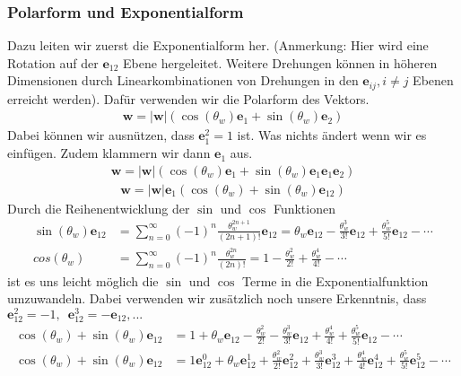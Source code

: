 \subsubsection{Polarform und Exponentialform}
Dazu leiten wir zuerst die Exponentialform her. (Anmerkung: Hier wird eine Rotation auf der $\mathbf{e}_{12}$ Ebene hergeleitet. Weitere Drehungen können in höheren Dimensionen durch Linearkombinationen von Drehungen in den $\mathbf{e}_{ij}, i\not=j$ Ebenen erreicht werden). Dafür verwenden wir die Polarform des Vektors.
\begin{align}
	\mathbf{w} = |\mathbf{w}| \left(\cos(\theta_w) \mathbf{e}_1 + \sin(\theta_w) \mathbf{e}_2\right)
\end{align}
Dabei können wir ausnützen, dass $\mathbf{e}_1^2 = 1$ ist. Was nichts ändert wenn wir es einfügen. Zudem klammern wir dann $\mathbf{e}_1$ aus. 
\begin{align}\label{e1ausklammern}
	\mathbf{w} = |\mathbf{w}| \left(\cos(\theta_w) \mathbf{e}_1 + \sin(\theta_w) \mathbf{e}_1\mathbf{e}_1\mathbf{e}_2\right)
\end{align}
\begin{align}
	\mathbf{w} = |\mathbf{w}|\mathbf{e}_1\left(\cos(\theta_w)+ \sin(\theta_w) \mathbf{e}_{12}\right)
\end{align}
Durch die Reihenentwicklung der $\sin$ und $\cos$ Funktionen
\begin{align}
	\sin(\theta_w)\mathbf{e}_{12}&=\sum _{n=0}^{\infty }(-1)^{n}{\frac {\theta_w^{2n+1}}{(2n+1)!}}\mathbf{e}_{12} =\theta_w\mathbf{e}_{12}-{\frac {\theta_w^{3}}{3!}}\mathbf{e}_{12}+{\frac {\theta_w^{5}}{5!}}\mathbf{e}_{12}-\cdots \\
	cos(\theta_w)&=\sum _{n=0}^{\infty }(-1)^{n}{\frac {\theta_w^{2n}}{(2n)!}} =1-{\frac {\theta_w^{2}}{2!}}+{\frac {\theta_w^{4}}{4!}}-\cdots
\end{align}
ist es uns leicht möglich die $\sin$ und $\cos$ Terme in die Exponentialfunktion umzuwandeln. Dabei verwenden wir zusätzlich noch unsere Erkenntnis, dass $\mathbf{e}_{12}^2=-1, \enspace\mathbf{e}_{12}^3=-\mathbf{e}_{12}, ...$
\begin{align}
	\cos(\theta_w)+ \sin(\theta_w) \mathbf{e}_{12} &= 1+\theta_w\mathbf{e}_{12}-{\frac {\theta_w^{2}}{2!}}-{\frac {\theta_w^{3}}{3!}}\mathbf{e}_{12}+{\frac {\theta_w^{4}}{4!}}+{\frac {\theta_w^{5}}{5!}}\mathbf{e}_{12}-\cdots\\
	\cos(\theta_w)+ \sin(\theta_w) \mathbf{e}_{12} &= 1 \mathbf{e}_{12}^0+\theta_w\mathbf{e}_{12}^1+{\frac {\theta_w^{2}}{2!}}\mathbf{e}_{12}^2+{\frac {\theta_w^{3}}{3!}}\mathbf{e}_{12}^3+{\frac {\theta_w^{4}}{4!}}\mathbf{e}_{12}^4+{\frac {\theta_w^{5}}{5!}}\mathbf{e}_{12}^5-\cdots\\
\end{align}
